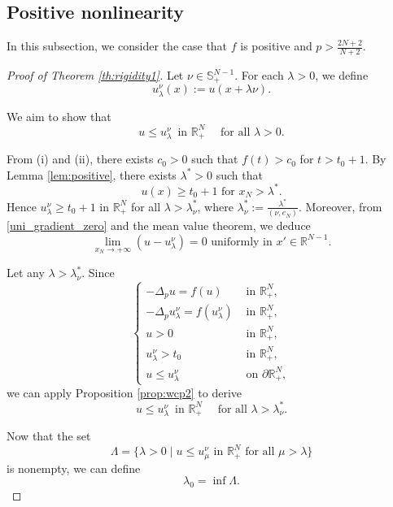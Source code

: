 \documentclass[reqno]{amsart}
\theoremstyle{plain}
\theoremstyle{definition}
\theoremstyle{remark}
\begin{document}
	\subsection{Positive nonlinearity}
	In this subsection, we consider the case that $f$ is positive and $p>\frac{2N+2}{N+2}$.
	\begin{proof}[Proof of Theorem \ref{th:rigidity1}]	
		Let $\nu\in \mathbb{S}^{N-1}_+$.
		For each $\lambda>0$, we define
		\[
		u_\lambda^\nu (x) := u(x+\lambda\nu).
		\]
		
		We aim to show that
		\begin{equation}\label{nu_monotone}
			u \le u_\lambda^\nu \,\text{ in } \mathbb{R}^N_+ \quad\text{ for all } \lambda>0.
		\end{equation}
		
		From (i) and (ii), there exists $c_0>0$ such that $f(t)>c_0$ for $t>t_0+1$. By Lemma \ref{lem:positive}, there exists $\lambda^*>0$ such that
		\begin{equation}\label{b}
			u(x) \ge t_0+1 \text{ for } x_N>\lambda^*.
		\end{equation}
		Hence $u_\lambda^\nu \ge t_0+1$ in $\mathbb{R}^N_+$ for all $\lambda>\lambda_\nu^*$, where $\lambda_\nu^*:=\frac{\lambda^*}{(\nu,e_N)}$. Moreover, from \eqref{uni_gradient_zero} and the mean value theorem, we deduce
		\[
		\lim_{x_N\to+\infty} (u-u_\lambda^\nu) = 0 \text{ uniformly in } x'\in\mathbb{R}^{N-1}.
		\]
		
		Let any $\lambda>\lambda_\nu^*$. Since
		\[
		\begin{cases}
			-\Delta_p u = f(u) &\text{ in } \mathbb{R}^N_+,\\
			-\Delta_p u_\lambda^\nu = f(u_\lambda^\nu) &\text{ in } \mathbb{R}^N_+,\\
			u>0 &\text{ in } \mathbb{R}^N_+,\\
			u_\lambda^\nu>t_0 &\text{ in } \mathbb{R}^N_+,\\
			u \le u_\lambda^\nu &\text{ on } \partial\mathbb{R}^N_+,
		\end{cases}
		\]
		we can apply Proposition \ref{prop:wcp2} to derive
		\begin{equation}\label{reflection_comparison2}
			u \le u_\lambda^\nu \,\text{ in } \mathbb{R}^N_+ \quad\text{ for all } \lambda>\lambda_\nu^*.
		\end{equation}
		
		Now that the set
		\[
		\Lambda = \{ \lambda>0 \mid u \le u_\mu^\nu \text{ in } \mathbb{R}^N_+ \text{ for all } \mu > \lambda \}
		\]
		is nonempty, we can define
		\[
		\lambda_0 = \inf \Lambda.
		\]
		

\end{proof}
\end{document}
